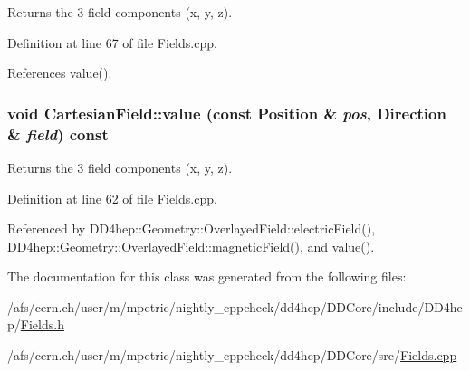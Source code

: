 Returns the 3 field components (x, y, z). 

Definition at line 67 of file Fields.cpp.

References value().\hypertarget{class_d_d4hep_1_1_geometry_1_1_cartesian_field_a124dcb501e72381b6c5aacfd5382822b}{
\subsubsection[{value}]{\setlength{\rightskip}{0pt plus 5cm}void CartesianField::value (const {\bf Position} \& {\em pos}, \/  {\bf Direction} \& {\em field}) const}}
\label{class_d_d4hep_1_1_geometry_1_1_cartesian_field_a124dcb501e72381b6c5aacfd5382822b}


Returns the 3 field components (x, y, z). 

Definition at line 62 of file Fields.cpp.

Referenced by DD4hep::Geometry::OverlayedField::electricField(), DD4hep::Geometry::OverlayedField::magneticField(), and value().

The documentation for this class was generated from the following files:\begin{DoxyCompactItemize}
\item 
/afs/cern.ch/user/m/mpetric/nightly\_\-cppcheck/dd4hep/DDCore/include/DD4hep/\hyperlink{_fields_8h}{Fields.h}\item 
/afs/cern.ch/user/m/mpetric/nightly\_\-cppcheck/dd4hep/DDCore/src/\hyperlink{_fields_8cpp}{Fields.cpp}\end{DoxyCompactItemize}
